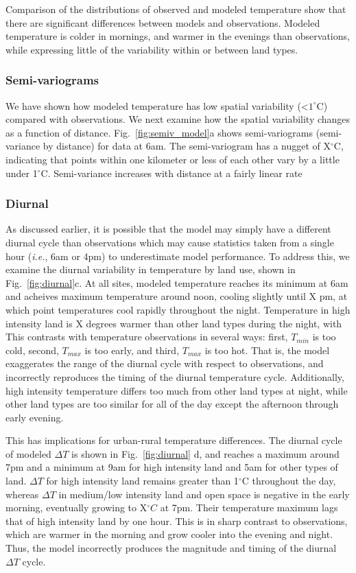 \documentclass[draft,linenumbers]{agujournal}
\begin{document}
Comparison of the distributions of observed and modeled temperature show that there are significant differences between models and observations. Modeled temperature is colder in mornings, and warmer in the evenings than observations, while expressing little of the variability within or between land types. 

\subsubsection{Semi-variograms}
We have shown how modeled temperature has low spatial variability (<$1^\circ$C) compared with observations. We next examine how the spatial variability changes as a function of distance. Fig.~\ref{fig:semiv_model}a shows semi-variograms (semi-variance  by distance) for data at 6am. The semi-variogram has a nugget of X$^\circ$C, indicating that points within one kilometer or less of each other vary by a little under 1$^\circ$C. Semi-variance increases with distance at a fairly linear rate

\subsubsection{Diurnal}
As discussed earlier, it is possible that the model may simply have a different diurnal cycle than observations which may cause statistics taken from a single hour (\textit{i.e.}, 6am or 4pm) to underestimate model performance. To address this, we examine the diurnal variability in temperature by land use, shown in Fig.~\ref{fig:diurnal}c. At all sites, modeled temperature reaches its minimum at 6am and acheives maximum temperature around noon, cooling slightly until X pm,
 at which point temperatures cool rapidly throughout the night. Temperature in high intensity land is X degrees 
 warmer than other land types during the night, with  This contrasts with temperature observations in several ways: first, $T_{min}$ is too cold, second, $T_{max}$ is too early, and third, $T_{max}$ is too hot. That is, the model exaggerates the range of the diurnal cycle with respect to observations, and incorrectly reproduces the timing of the diurnal temperature cycle. Additionally, high intensity temperature differs too much from other land types at night, while other land types are too similar for all of the day except the afternoon through early evening. 
 
 This has implications for urban-rural temperature differences. The diurnal cycle of modeled $\Delta T$ is shown in Fig.~\ref{fig:diurnal} d, and reaches a maximum around 7pm and a minimum at 9am for high intensity land and 5am for other types of land. $\Delta T$ for high intensity land remains greater than 1$^\circ$C throughout the day, whereas $\Delta T$ in medium/low intensity land and open space is negative in the early morning, eventually growing to X$^\circ C$ at 7pm. Their temperature maximum lags that of high intensity land by one hour. This is in sharp contrast to observations, which are warmer in the morning and grow cooler into the evening and night. Thus, the model incorrectly produces the magnitude and timing of the diurnal $\Delta T$ cycle. %
 
\end{document}
